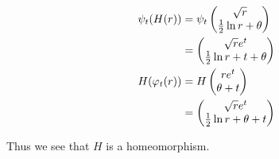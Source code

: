 \begin{solution}
    \newpage
    \alignbreak
    \begin{align}
        \psi_t(H(r)) &= \psi_t\begin{pmatrix}\sqrt{r}\\ \frac{1}{2}\ln r + \theta\end{pmatrix}\nonumber\\
                     &= \begin{pmatrix}\sqrt{r} e^t \\ \frac{1}{2}\ln r + t + \theta \end{pmatrix}\nonumber\\
        H(\varphi_t(r))  &= H\begin{pmatrix}re^t\\ \theta + t\end{pmatrix}\nonumber\\
                     &= \begin{pmatrix}\sqrt{r}e^t\\ \frac{1}{2}\ln r + \theta + t\end{pmatrix}\nonumber
    \end{align}
    \alignbreak

    Thus we see that $H$ is a homeomorphism.

\end{solution}


